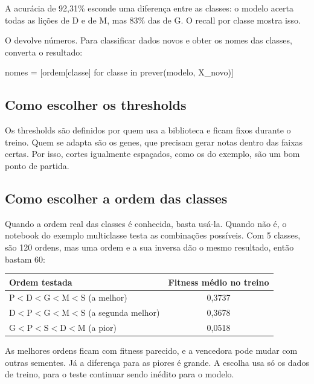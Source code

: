 \documentclass[11pt,a4paper]{article}
\newcommand{\code}[1]{\texttt{\detokenize{#1}}}
\newenvironment{tabela}{\par\nopagebreak[4]\vspace{0.3em}\nopagebreak[4]\begingroup\centering\small}{\par\endgroup\vspace{0.6em}}
\begin{document}
A acurácia de 92,31\% esconde uma diferença entre as classes: o modelo acerta todas as lições de D e de M, mas 83\% das de G. O recall por classe mostra isso.

O \code{prever} devolve números. Para classificar dados novos e obter os nomes das classes, converta o resultado:

\begin{py}
nomes = [ordem[classe] for classe in prever(modelo, X_novo)]
\end{py}

\subsection{Como escolher os thresholds}

Os thresholds são definidos por quem usa a biblioteca e ficam fixos durante o treino. Quem se adapta são os genes, que precisam gerar notas dentro das faixas certas. Por isso, cortes igualmente espaçados, como os do exemplo, são um bom ponto de partida.

\subsection{Como escolher a ordem das classes}

Quando a ordem real das classes é conhecida, basta usá-la. Quando não é, o notebook do exemplo multiclasse testa as combinações possíveis. Com 5 classes, são 120 ordens, mas uma ordem e a sua inversa dão o mesmo resultado, então bastam 60:

\begin{tabela}
\begin{tabular}{lc}
\toprule
Ordem testada & Fitness médio no treino\\
\midrule
$\mathrm{P} < \mathrm{D} < \mathrm{G} < \mathrm{M} < \mathrm{S}$ (a melhor) & 0,3737\\
$\mathrm{D} < \mathrm{P} < \mathrm{G} < \mathrm{M} < \mathrm{S}$ (a segunda melhor) & 0,3678\\
$\mathrm{G} < \mathrm{P} < \mathrm{S} < \mathrm{D} < \mathrm{M}$ (a pior) & 0,0518\\
\bottomrule
\end{tabular}
\end{tabela}

As melhores ordens ficam com fitness parecido, e a vencedora pode mudar com outras sementes. Já a diferença para as piores é grande. A escolha usa só os dados de treino, para o teste continuar sendo inédito para o modelo.
\end{document}

